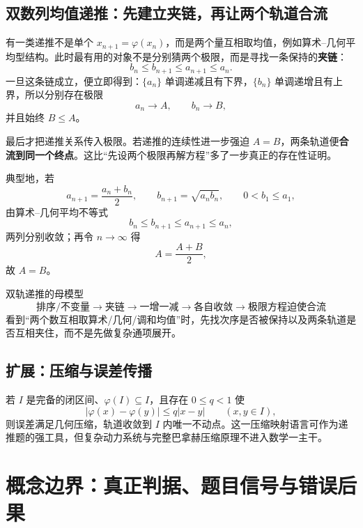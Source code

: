 \documentclass[11pt,a4paper]{ctexart}
\newcommand{\kw}[1]{\textbf{\color{deep}#1}}
\begin{document}
\subsection{双数列均值递推：先建立夹链，再让两个轨道合流}

有一类递推不是单个 $x_{n+1}=\varphi(x_n)$，而是两个量互相取均值，例如算术--几何平均型结构。此时最有用的对象不是分别猜两个极限，而是寻找一条保持的\kw{夹链}：
\[
b_n\le b_{n+1}\le a_{n+1}\le a_n.
\]
一旦这条链成立，便立即得到：$\{a_n\}$ 单调递减且有下界，$\{b_n\}$ 单调递增且有上界，所以分别存在极限
\[
a_n\to A,\qquad b_n\to B,
\]
并且始终 $B\le A$。

最后才把递推关系传入极限。若递推的连续性进一步强迫 $A=B$，两条轨道便\kw{合流到同一个终点}。这比“先设两个极限再解方程”多了一步真正的存在性证明。

典型地，若
\[
a_{n+1}=\frac{a_n+b_n}{2},\qquad
b_{n+1}=\sqrt{a_nb_n},\qquad 0<b_1\le a_1,
\]
由算术--几何平均不等式
\[
b_n\le b_{n+1}\le a_{n+1}\le a_n,
\]
两列分别收敛；再令 $n\to\infty$ 得
\[
A=\frac{A+B}{2},
\]
故 $A=B$。

\begin{corebox}{双轨递推的母模型}
\[
\boxed{\text{排序/不变量}\to\text{夹链}\to\text{一增一减}\to\text{各自收敛}\to\text{极限方程迫使合流}}
\]
看到“两个数互相取算术/几何/调和均值”时，先找次序是否被保持以及两条轨道是否互相夹住，而不是先做复杂通项展开。
\end{corebox}

\subsection{扩展：压缩与误差传播}

若 $I$ 是完备的闭区间、$\varphi(I)\subseteq I$，且存在 $0\le q<1$ 使
\[
\lvert\varphi(x)-\varphi(y)\rvert\le q\lvert x-y\rvert\qquad(x,y\in I),
\]
则误差满足几何压缩，轨道收敛到 $I$ 内唯一不动点。这一压缩映射语言可作为递推题的强工具，但复杂动力系统与完整巴拿赫压缩原理不进入数学一主干。

\section{概念边界：真正判据、题目信号与错误后果}
\end{document}

